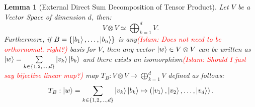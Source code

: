 \documentclass[12pt]{article}
\theoremstyle{plain}
\newtheorem{lemma}[theorem]{Lemma}
\newcommand{\IslamNote}[1]{\textcolor{red}{(Islam: #1)}}
\newcommand{\IslamNote}[1]{}
\begin{document}
\begin{lemma}[External Direct Sum Decomposition of Tensor Product]\label{lemma:external-direct-sum-tensor-product}
    Let $V$ be a Vector Space of dimension $d$, then:
    \[V \otimes V \simeq \bigoplus_{k = 1}^d V.\]
    Furthermore, if $B = \{\ket{b_1}, \dots, \ket{b_n}\}$ is any\IslamNote{Does not need to be orthornomal, right?} basis for $V$, then any vector $\ket{w} \in V \otimes V$ can be written as  $\ket{w} = \sum\limits_{k \in \{1, 2, \dots, d\}} \ket{v_{k}} \ket{b_k}$ and there exists an isomorphism\IslamNote{Should I just say bijective linear map?} map $T_B: V \otimes V \to \bigoplus_{k = 1}^d V$ defined as follows:
    \begin{equation}
        T_B: \ket{w} = \sum\limits_{k \in \{1, 2, \dots, d\}}  \ket{v_{k}} \ket{b_k} \mapsto \left(\ket{v_1}, \ket{v_2}, \dots, \ket{v_d}\right).
    \end{equation}
\end{lemma}
\end{document}
